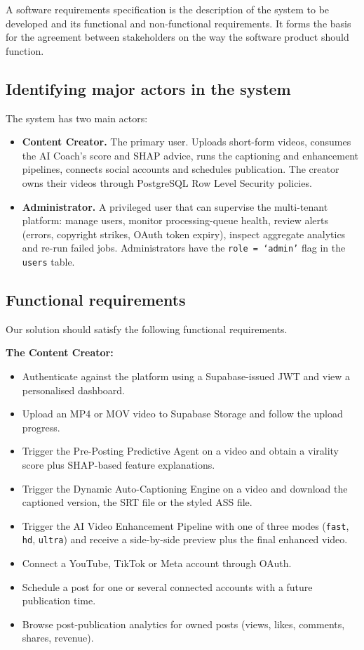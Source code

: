 A software requirements specification is the description of the system to be developed and
its functional and non-functional requirements. It forms the basis for the agreement between
stakeholders on the way the software product should function.

\subsection{Identifying major actors in the system}
\label{sec:actors}

The system has two main actors:

\begin{itemize}
  \item \textbf{Content Creator.} The primary user. Uploads short-form videos, consumes the
        AI Coach's score and SHAP advice, runs the captioning and enhancement pipelines,
        connects social accounts and schedules publication. The creator owns their videos
        through PostgreSQL Row Level Security policies.
  \item \textbf{Administrator.} A privileged user that can supervise the multi-tenant
        platform: manage users, monitor processing-queue health, review alerts (errors,
        copyright strikes, OAuth token expiry), inspect aggregate analytics and re-run failed
        jobs. Administrators have the \texttt{role = `admin'} flag in the \texttt{users}
        table.
\end{itemize}

\subsection{Functional requirements}
\label{sec:func_req}

Our solution should satisfy the following functional requirements.

\noindent\textbf{The Content Creator:}
\begin{itemize}
  \item Authenticate against the platform using a Supabase-issued JWT and view a personalised
        dashboard.
  \item Upload an MP4 or MOV video to Supabase Storage and follow the upload progress.
  \item Trigger the Pre-Posting Predictive Agent on a video and obtain a virality score plus
        SHAP-based feature explanations.
  \item Trigger the Dynamic Auto-Captioning Engine on a video and download the captioned
        version, the SRT file or the styled ASS file.
  \item Trigger the AI Video Enhancement Pipeline with one of three modes
        (\texttt{fast}, \texttt{hd}, \texttt{ultra}) and receive a side-by-side preview plus
        the final enhanced video.
  \item Connect a YouTube, TikTok or Meta account through OAuth.
  \item Schedule a post for one or several connected accounts with a future publication time.
  \item Browse post-publication analytics for owned posts (views, likes, comments, shares,
        revenue).
\end{itemize}

